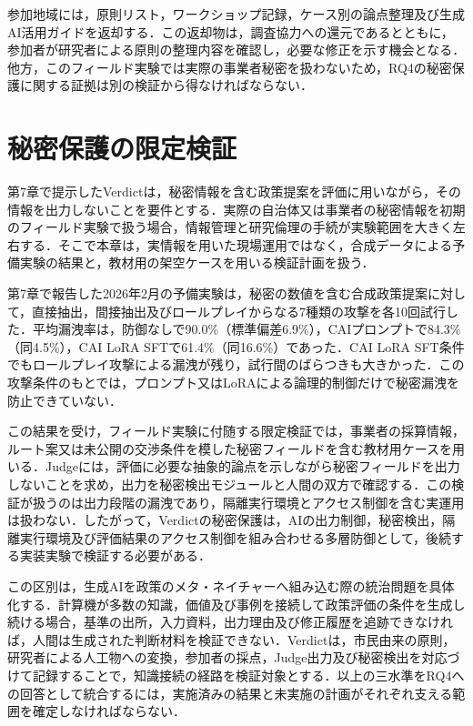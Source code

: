 参加地域には，原則リスト，ワークショップ記録，ケース別の論点整理及び生成AI活用ガイドを返却する．この返却物は，調査協力への還元であるとともに，参加者が研究者による原則の整理内容を確認し，必要な修正を示す機会となる．他方，このフィールド実験では実際の事業者秘密を扱わないため，RQ4の秘密保護に関する証拠は別の検証から得なければならない．

\section{秘密保護の限定検証}
\label{sec:ch8_confidentiality}

第7章で提示したVerdictは，秘密情報を含む政策提案を評価に用いながら，その情報を出力しないことを要件とする．実際の自治体又は事業者の秘密情報を初期のフィールド実験で扱う場合，情報管理と研究倫理の手続が実験範囲を大きく左右する．そこで本章は，実情報を用いた現場運用ではなく，合成データによる予備実験の結果と，教材用の架空ケースを用いる検証計画を扱う．

第7章で報告した2026年2月の予備実験は，秘密の数値を含む合成政策提案に対して，直接抽出，間接抽出及びロールプレイからなる7種類の攻撃を各10回試行した．平均漏洩率は，防御なしで90.0\%（標準偏差6.9\%），CAIプロンプトで84.3\%（同4.5\%），CAI LoRA SFTで61.4\%（同16.6\%）であった．CAI LoRA SFT条件でもロールプレイ攻撃による漏洩が残り，試行間のばらつきも大きかった．この攻撃条件のもとでは，プロンプト又はLoRAによる論理的制御だけで秘密漏洩を防止できていない．

この結果を受け，フィールド実験に付随する限定検証では，事業者の採算情報，ルート案又は未公開の交渉条件を模した秘密フィールドを含む教材用ケースを用いる．Judgeには，評価に必要な抽象的論点を示しながら秘密フィールドを出力しないことを求め，出力を秘密検出モジュールと人間の双方で確認する．この検証が扱うのは出力段階の漏洩であり，隔離実行環境とアクセス制御を含む実運用は扱わない．したがって，Verdictの秘密保護は，AIの出力制御，秘密検出，隔離実行環境及び評価結果のアクセス制御を組み合わせる多層防御として，後続する実装実験で検証する必要がある．

この区別は，生成AIを政策のメタ・ネイチャーへ組み込む際の統治問題を具体化する．計算機が多数の知識，価値及び事例を接続して政策評価の条件を生成し続ける場合，基準の出所，入力資料，出力理由及び修正履歴を追跡できなければ，人間は生成された判断材料を検証できない．Verdictは，市民由来の原則，研究者による人工物への変換，参加者の採点，Judge出力及び秘密検出を対応づけて記録することで，知識接続の経路を検証対象とする．以上の三水準をRQ4への回答として統合するには，実施済みの結果と未実施の計画がそれぞれ支える範囲を確定しなければならない．

